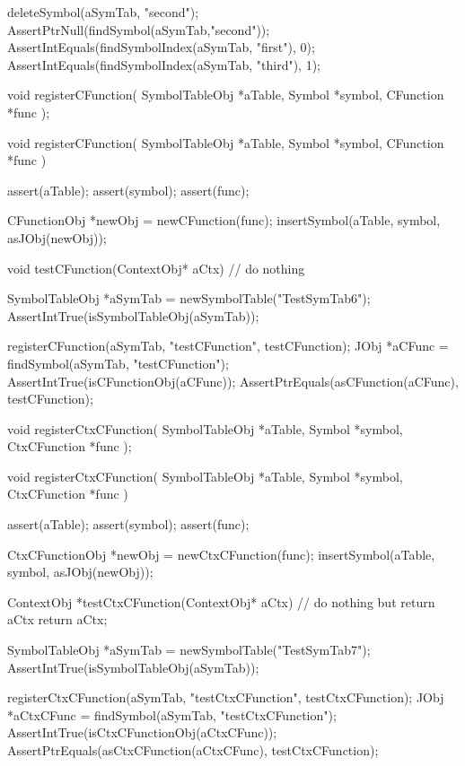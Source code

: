   deleteSymbol(aSymTab, "second");
  AssertPtrNull(findSymbol(aSymTab,"second"));
  AssertIntEquals(findSymbolIndex(aSymTab, "first"),  0);
  AssertIntEquals(findSymbolIndex(aSymTab, "third"),  1);
\stopCTest
\stopTestCase
\stopTestSuite

\startTestSuite[registerCFunction]

\startCHeader
void registerCFunction(
  SymbolTableObj *aTable,
  Symbol         *symbol,
  CFunction      *func
);
\stopCHeader

\startCCode
void registerCFunction(
  SymbolTableObj *aTable,
  Symbol         *symbol,
  CFunction      *func
) {
  assert(aTable);
  assert(symbol);
  assert(func);
  
  CFunctionObj *newObj = newCFunction(func);
  insertSymbol(aTable, symbol, asJObj(newObj));
}
\stopCCode

\startCTest
  void testCFunction(ContextObj* aCtx){
    // do nothing
  }

  SymbolTableObj *aSymTab = newSymbolTable("TestSymTab6");
  AssertIntTrue(isSymbolTableObj(aSymTab));

  registerCFunction(aSymTab, "testCFunction", testCFunction);
  JObj *aCFunc = findSymbol(aSymTab, "testCFunction");
  AssertIntTrue(isCFunctionObj(aCFunc));
  AssertPtrEquals(asCFunction(aCFunc), testCFunction);
\stopCTest
\stopTestCase
\stopTestSuite

\startTestSuite[registerCtxCFunction]

\startCHeader
void registerCtxCFunction(
  SymbolTableObj *aTable,
  Symbol         *symbol,
  CtxCFunction   *func
);
\stopCHeader

\startCCode
void registerCtxCFunction(
  SymbolTableObj *aTable,
  Symbol         *symbol,
  CtxCFunction   *func
) {
  assert(aTable);
  assert(symbol);
  assert(func);
  
  CtxCFunctionObj *newObj = newCtxCFunction(func);
  insertSymbol(aTable, symbol, asJObj(newObj));
}
\stopCCode


\startCTest
  ContextObj *testCtxCFunction(ContextObj* aCtx){
    // do nothing but return aCtx
    return aCtx;
  }

  SymbolTableObj *aSymTab = newSymbolTable("TestSymTab7");
  AssertIntTrue(isSymbolTableObj(aSymTab));
  
  registerCtxCFunction(aSymTab, "testCtxCFunction", testCtxCFunction);
  JObj *aCtxCFunc = findSymbol(aSymTab, "testCtxCFunction");
  AssertIntTrue(isCtxCFunctionObj(aCtxCFunc));
  AssertPtrEquals(asCtxCFunction(aCtxCFunc), testCtxCFunction);
\stopCTest
\stopTestCase
\stopTestSuite

